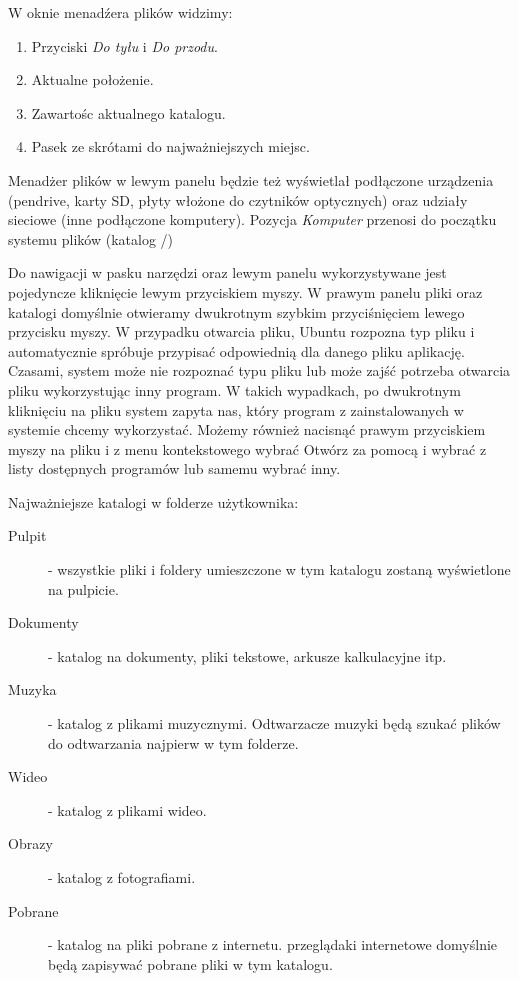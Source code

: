 W oknie menadźera plików widzimy:
\begin{enumerate}
\item Przyciski \textit{Do tyłu} i \textit{Do przodu}.
\item Aktualne położenie.
\item Zawartośc aktualnego katalogu.
\item Pasek ze skrótami do najważniejszych miejsc.
\end{enumerate}

Menadżer plików w lewym panelu będzie też wyświetlał podłączone urządzenia (pendrive, karty SD, płyty włożone do czytników optycznych) oraz udziały sieciowe (inne podłączone komputery). Pozycja \textit{Komputer} przenosi do początku systemu plików (katalog /)

Do nawigacji w pasku narzędzi oraz lewym panelu wykorzystywane jest pojedyncze kliknięcie lewym przyciskiem myszy. W prawym panelu pliki oraz katalogi domyślnie otwieramy dwukrotnym szybkim przyciśnięciem lewego przycisku myszy. W przypadku otwarcia pliku, Ubuntu rozpozna typ pliku i automatycznie spróbuje przypisać odpowiednią dla danego pliku aplikację. Czasami, system może nie rozpoznać typu pliku lub może zajść potrzeba otwarcia pliku wykorzystując inny program. W takich wypadkach, po dwukrotnym kliknięciu na pliku system zapyta nas, który program z zainstalowanych w systemie chcemy wykorzystać. Możemy również nacisnąć prawym przyciskiem myszy na pliku i z menu kontekstowego wybrać Otwórz za pomocą i wybrać z listy dostępnych programów lub samemu wybrać inny.

Najważniejsze katalogi w folderze użytkownika:
\begin{description}
\item[Pulpit] - wszystkie pliki i foldery umieszczone w tym katalogu zostaną wyświetlone na pulpicie.
\item[Dokumenty] - katalog na dokumenty, pliki tekstowe, arkusze kalkulacyjne itp.
\item[Muzyka] - katalog z plikami muzycznymi. Odtwarzacze muzyki będą szukać plików do odtwarzania najpierw w tym folderze.
\item[Wideo] - katalog z plikami wideo.
\item[Obrazy] - katalog z fotografiami.
\item[Pobrane] - katalog na pliki pobrane z internetu. przeglądaki internetowe domyślnie będą zapisywać pobrane pliki w tym katalogu.

\end{description}

